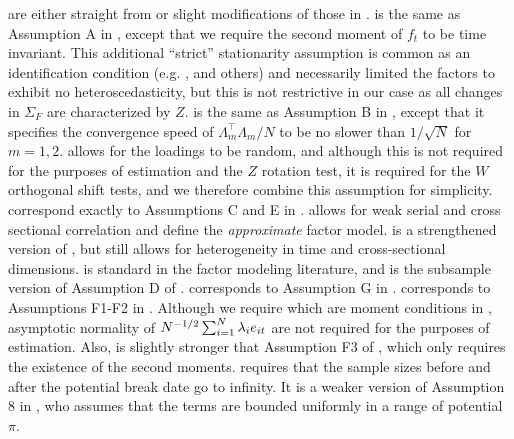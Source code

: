 \documentclass[12pt]{article}
\newcommand*{\tran}{\intercal}
\theoremstyle{plain}
\numberwithin{equation}{section}
\begin{document}
 are either straight from or slight modifications of those in \textcite{bai_inferential_2003}.  is the same as Assumption A in \textcite{bai_inferential_2003}, except that we require the second moment of $f_t$ to be time invariant. This additional ``strict'' stationarity assumption is common as an identification condition (e.g. \textcite{han_tests_2015}, \textcite{baltagi_identification_2017} and others) and necessarily limited the factors to exhibit no heteroscedasticity, but this is not restrictive in our case as all changes in $\Sigma_F$ are characterized by $Z$.  is the same as Assumption B in \textcite{bai_inferential_2003}, except that it specifies the convergence speed of $\Lambda_m^\tran \Lambda_m/N$ to be no slower than $1/\sqrt{N}$ for $m = 1, 2$.  allows for the loadings to be random, and although this is not required for the purposes of estimation and the $Z$ rotation test, it is required for the $W$ orthogonal shift tests, and we therefore combine this assumption for simplicity.  correspond exactly to Assumptions C and E in \textcite{bai_inferential_2003}. 
 allows for weak serial and cross sectional correlation and define the \emph{approximate} factor model.  is a strengthened version of , but still allows for heterogeneity in time and cross-sectional dimensions.  is standard in the factor modeling literature, and is the subsample version of Assumption D of \textcite{bai_confidence_2006}.  corresponds to Assumption G in \textcite{bai_inferential_2003}.  corresponds to Assumptions F1-F2 in \textcite{bai_inferential_2003}. Although we require  which are moment conditions in \textcite{bai_inferential_2003}, asymptotic normality of $N^{-1/2} \sum_{i = 1}^{N} \lambda_i e_{it}$ are not required for the purposes of estimation. Also,  is slightly stronger that Assumption F3 of \textcite{bai_inferential_2003}, which only requires the existence of the second moments.  requires that the sample sizes before and after the potential break date go to infinity. It is a weaker version of Assumption 8 in \textcite{han_tests_2015}, who assumes that the terms are bounded uniformly in a range of potential $\pi$.
\end{document}

